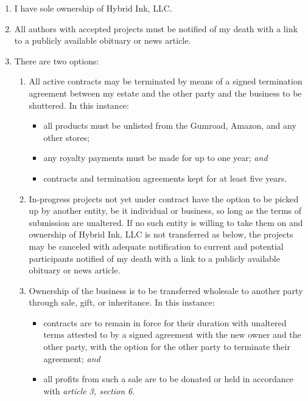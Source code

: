 \begin{enumerate}
\def\labelenumi{\arabic{enumi}.}
\tightlist
\item
  I have sole ownership of Hybrid Ink, LLC.
\item
  All authors with accepted projects must be notified of my death with a link to a publicly available obituary or news article.
\item
  There are two options:

  \begin{enumerate}
  \def\labelenumii{\arabic{enumii}.}
  \tightlist
  \item
    All active contracts may be terminated by means of a signed termination agreement between my estate and the other party and the business to be shuttered. In this instance:

    \begin{itemize}
    \tightlist
    \item
      all products must be unlisted from the Gumroad, Amazon, and any other stores;
    \item
      any royalty payments must be made for up to one year; \emph{and}
    \item
      contracts and termination agreements kept for at least five years.
    \end{itemize}
  \item
    In-progress projects not yet under contract have the option to be picked up by another entity, be it individual or business, so long as the terms of submission are unaltered. If no such entity is willing to take them on and ownership of Hybrid Ink, LLC is not transferred as below, the projects may be canceled with adequate notification to current and potential participants notified of my death with a link to a publicly available obituary or news article.
  \item
    Ownership of the business is to be transferred wholesale to another party through sale, gift, or inheritance. In this instance:

    \begin{itemize}
    \tightlist
    \item
      contracts are to remain in force for their duration with unaltered terms attested to by a signed agreement with the new owner and the other party, with the option for the other party to terminate their agreement; \emph{and}
    \item
      all profits from such a sale are to be donated or held in accordance with \emph{article 3, section 6}.
    \end{itemize}
  \end{enumerate}
\end{enumerate}

